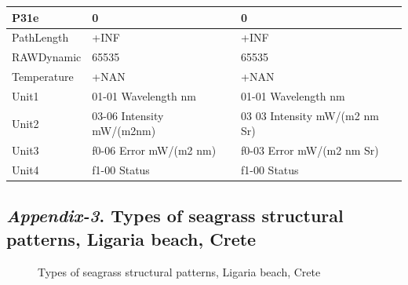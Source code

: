 \documentclass[10pt, a4paper]{article}
\begin{document}
\begin{appendices}
\begin{table}[H]
\begin{tabular}{| p{3cm} | p{3cm} | p{5cm} |}
	   P31e & 0 & 0 \\ \hline
	   PathLength & +INF & +INF \\ \hline
	   RAWDynamic & 65535 & 65535 \\ \hline
	   Temperature & +NAN & +NAN \\ \hline
	   Unit1 & 01-01 Wavelength nm &  01-01 Wavelength nm \\ \hline
	   Unit2 & 03-06 Intensity mW/(m2nm) & 03 03 Intensity mW/(m2 nm Sr) \\ \hline
	   Unit3 & f0-06 Error mW/(m2 nm) & f0-03 Error mW/(m2 nm Sr) \\ \hline
	  Unit4 & f1-00 Status & f1-00 Status \\ \hline
	\end{tabular}
\end{table}
\pagebreak

\subsection{\textit{Appendix-3}. Types of seagrass structural patterns, Ligaria beach, Crete}

\begin{figure}[h]
	\centering
	\hspace{1mm}
	\hspace{1mm}
	\caption{Types of seagrass structural patterns, Ligaria beach, Crete}
	\label{fig:A.3}
\end{figure}


\end{appendices}
\end{document}
